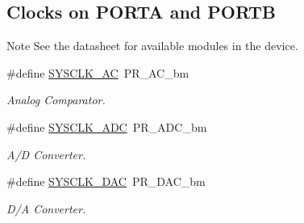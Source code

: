 \subsection*{Clocks on P\-O\-R\-T\-A and P\-O\-R\-T\-B}
\label{_amgrpf22f159d1bf7c80ed07d15fc3146f864}%
 \begin{DoxyNote}{Note}
See the datasheet for available modules in the device. 
\end{DoxyNote}
\begin{DoxyCompactItemize}
\item 
\hypertarget{group__sysclk__group_gacb129d5fc20d494debd5c72ae5459f18}{\#define \hyperlink{group__sysclk__group_gacb129d5fc20d494debd5c72ae5459f18}{S\-Y\-S\-C\-L\-K\-\_\-\-A\-C}~P\-R\-\_\-\-A\-C\-\_\-bm}\label{group__sysclk__group_gacb129d5fc20d494debd5c72ae5459f18}

\begin{DoxyCompactList}\small\item\em Analog Comparator. \end{DoxyCompactList}\item 
\hypertarget{group__sysclk__group_ga4c530814a371c788f9608e46b81feb93}{\#define \hyperlink{group__sysclk__group_ga4c530814a371c788f9608e46b81feb93}{S\-Y\-S\-C\-L\-K\-\_\-\-A\-D\-C}~P\-R\-\_\-\-A\-D\-C\-\_\-bm}\label{group__sysclk__group_ga4c530814a371c788f9608e46b81feb93}

\begin{DoxyCompactList}\small\item\em A/\-D Converter. \end{DoxyCompactList}\item 
\hypertarget{group__sysclk__group_ga1a906a79658f393a0735f668f9ff2e5f}{\#define \hyperlink{group__sysclk__group_ga1a906a79658f393a0735f668f9ff2e5f}{S\-Y\-S\-C\-L\-K\-\_\-\-D\-A\-C}~P\-R\-\_\-\-D\-A\-C\-\_\-bm}\label{group__sysclk__group_ga1a906a79658f393a0735f668f9ff2e5f}

\begin{DoxyCompactList}\small\item\em D/\-A Converter. \end{DoxyCompactList}\end{DoxyCompactItemize}
